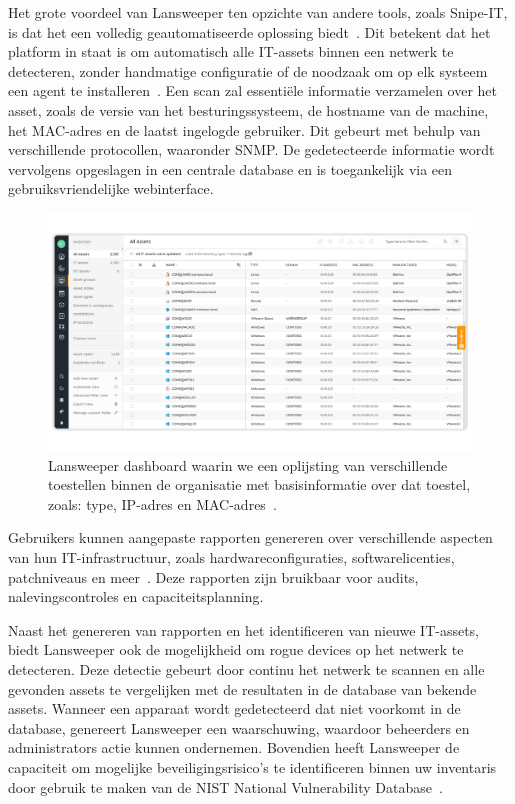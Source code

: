 Het grote voordeel van Lansweeper ten opzichte van andere tools, zoals Snipe-IT, is dat het een volledig geautomatiseerde oplossing biedt~\autocite{lansweeper-features}.
Dit betekent dat het platform in staat is om automatisch alle IT-assets binnen een netwerk te detecteren, zonder handmatige configuratie of de noodzaak om op elk systeem een agent te installeren~\autocite{lansweeper-getting-started}.
Een scan zal essenti\"ele informatie verzamelen over het asset, zoals de versie van het besturingssysteem, de hostname van de machine, het MAC-adres en de laatst ingelogde gebruiker.
Dit gebeurt met behulp van verschillende protocollen, waaronder SNMP.
De gedetecteerde informatie wordt vervolgens opgeslagen in een centrale database en is toegankelijk via een gebruiksvriendelijke webinterface.

\begin{figure}[h!]
    \includegraphics[width=\textwidth]
    {./graphics/lansweeper-dashboard.png}
    \caption{\label{fig:lansweeper-dashboard}Lansweeper dashboard waarin we een oplijsting van verschillende toestellen binnen de organisatie met basisinformatie over dat toestel, zoals: type, IP-adres en MAC-adres~\autocite{lansweeper-dashboard}.}
\end{figure}

Gebruikers kunnen aangepaste rapporten genereren over verschillende aspecten van hun IT-infrastructuur, zoals hardwareconfiguraties, softwarelicenties, patchniveaus en meer~\autocite{lansweeper-features}.
Deze rapporten zijn bruikbaar voor audits, nalevingscontroles en capaciteitsplanning.

Naast het genereren van rapporten en het identificeren van nieuwe IT-assets, biedt Lansweeper ook de mogelijkheid om rogue devices op het netwerk te detecteren.
Deze detectie gebeurt door continu het netwerk te scannen en alle gevonden assets te vergelijken met de resultaten in de database van bekende assets.
Wanneer een apparaat wordt gedetecteerd dat niet voorkomt in de database, genereert Lansweeper een waarschuwing, waardoor beheerders en administrators actie kunnen ondernemen.
Bovendien heeft Lansweeper de capaciteit om mogelijke beveiligingsrisico's te identificeren binnen uw inventaris door gebruik te maken van de NIST National Vulnerability Database~\autocite{lansweeper-cam}.
